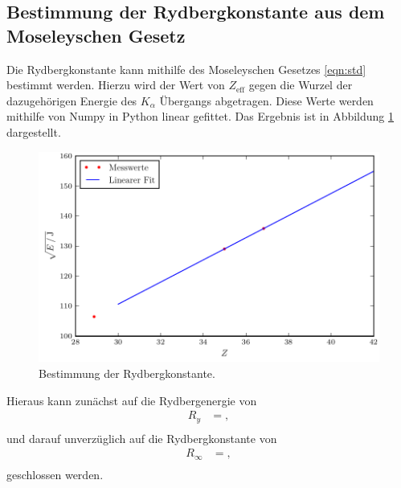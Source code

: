 \subsection{Bestimmung der Rydbergkonstante aus dem Moseleyschen Gesetz}
Die Rydbergkonstante kann mithilfe des Moseleyschen Gesetzes \eqref{eqn:std} bestimmt werden.
Hierzu wird der Wert von $Z_\text{eff}$ gegen die Wurzel der dazugehörigen Energie des $K_\alpha$ Übergangs abgetragen.
Diese Werte werden mithilfe von Numpy in Python linear gefittet. Das Ergebnis ist in Abbildung \ref{fig:plot7} dargestellt.
\begin{figure}
  \centering
  \includegraphics{build/plot_ryd.pdf}
  \caption{Bestimmung der Rydbergkonstante.}
  \label{fig:plot7}
\end{figure}
Hieraus kann zunächst auf die Rydbergenergie von
\begin{align*}
  R_y &= , \\
\end{align*}
und darauf unverzüglich auf die Rydbergkonstante von
\begin{align*}
  R_{\infty} &= , \\
\end{align*}
geschlossen werden.

